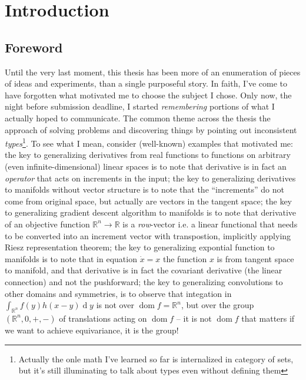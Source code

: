 \chapter{Introduction}


\section*{Foreword}

Until the very last moment, this thesis has been more of an enumeration of
pieces of ideas and experiments, than a single purposeful story. In faith, I've
come to have forgotten what motivated me to choose the subject I chose.  Only
now, the night before submission deadline, I started \emph{remembering}
portions of what I actually hoped to communicate. The common theme across the
thesis the approach of solving problems and discovering things by pointing out
inconsistent \emph{types}\footnote{Actually the onle math I've learned so far
is internalized in category of sets, but it's still illuminating to talk about
types even without defining them}. To see what I mean, consider (well-known)
examples that motivated me: the key to generalizing derivatives from real
functions to functions on arbitrary (even infinite-dimensional) linear spaces
is to note that derivative is in fact an \emph{operator} that acts on
increments in the input; the key to generalizing derivatives to manifolds
without vector structure is to note that the ``increments'' do not come from
original space, but actually are vectors in the tangent space; the key to
generalizing gradient descent algorithm to manifolds is to note that derivative
of an objective function $\mathbb{R}^n \to \mathbb{R}$ is a \emph{row}-vector
i.e. a linear functional that needs to be converted into an increment vector
with transpostion, implicitly applying Riesz representation theorem; the key to
generalizing expontial function to manifolds is to note that in equation
$\dot{x} = x$ the function $x$ is from tangent space to manifold, and that
derivative is in fact the covariant derivative (the linear connection) and not
the pushforward; the key to generalizing convolutions to other domains and
symmetries, is to observe that integation in $\int_{\mathbb{R}^n}
f(y)h(x-y)\operatorname{d}y$ is not over $\operatorname{dom}f=\mathbb{R}^n$,
but over the group $(\mathbb{R}^n,0,+,-)$ of translations acting on
$\operatorname{dom}f$ -- it is not $\operatorname{dom}f$ that matters if we
want to achieve equivariance, it is the group!

